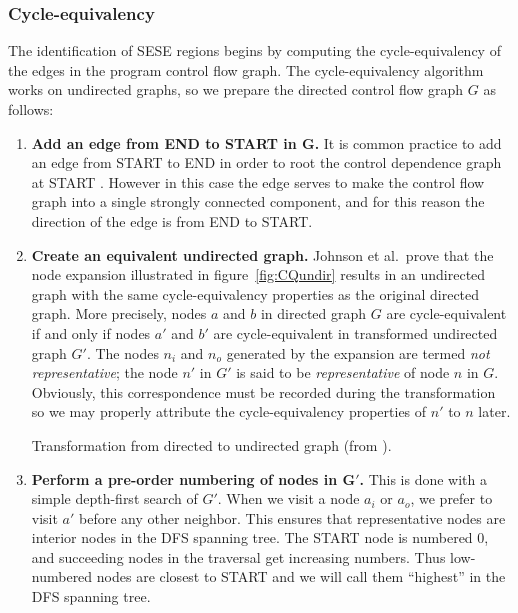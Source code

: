 \documentclass[12pt,titlepage,twoside]{article}
\newcommand*{\figscale}{1.0}
\begin{document}
\subsubsection{Cycle-equivalency}
\newcommand{\cyceq}{\equiv_{cq}}%
The identification of SESE regions begins by computing the
cycle-equivalency of the edges in the program control flow graph.  The
cycle-equivalency algorithm works on undirected graphs, so we prepare the
directed control flow graph $G$ as follows:
\begin{enumerate}
\item \textbf{Add an edge from END to START in $\mathbf{G}$.} It is common
practice to add an edge from START to END in order to root the control
dependence graph at START \cite{cytron89:ssa}.  However in this case
the edge serves to make the control flow graph into a single strongly
connected component, and for this reason the direction of the edge is
from END to START.
\item \textbf{Create an equivalent undirected graph.}  Johnson et al.\
prove that the node expansion illustrated in figure~\vref{fig:CQundir}
results in an undirected graph with the same cycle-equivalency
properties as the original directed graph.  More precisely, nodes $a$
and $b$ in directed graph $G$ are cycle-equivalent if and only if
nodes $a'$ and $b'$ are cycle-equivalent in transformed undirected
graph $G'$.  The nodes $n_i$ and $n_o$ generated by the expansion are
termed \emph{not representative}; the node $n'$ in $G'$ is said to be
\emph{representative} of node $n$ in $G$.  Obviously, this
correspondence must be recorded during the transformation so we may
properly attribute the cycle-equivalency properties of $n'$ to $n$
later.
\begin{myfigure}
\begin{center}
\renewcommand*{\figscale}{0.5}
\end{center}
\caption{Transformation from directed to undirected graph
	 (from \cite{johnson93:sese}).}
\label{fig:CQundir}
\end{myfigure}
\item \textbf{Perform a pre-order numbering of nodes in $\mathbf{G'}$.}
This is done with a simple depth-first search of $G'$.  When we visit
a node $a_i$ or $a_o$, we prefer to visit $a'$ before any other
neighbor.  This ensures that representative nodes are interior nodes
in the DFS spanning tree. The START node is numbered 0, and succeeding
nodes in the traversal get increasing numbers.  Thus low-numbered
nodes are closest to START and we will call them ``highest'' in the
DFS spanning tree.
\end{enumerate}
\end{document}
